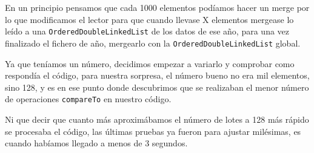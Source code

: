 \documentclass[a4paper,11pt]{report}
\begin{document}
En un principio pensamos que cada 1000 elementos podíamos hacer un merge por lo que modificamos el lector para que cuando llevase X elementos mergease lo leído a una \texttt{OrderedDoubleLinkedList} de los datos de ese año, para una vez finalizado el fichero de año, mergearlo con la \texttt{OrderedDoubleLinkedList} global.

Ya que teníamos un número, decidimos empezar a variarlo y comprobar como respondía el código, para nuestra sorpresa, el número bueno no era mil elementos, sino 128, y es en ese punto donde descubrimos que se realizaban el menor número de operaciones \texttt{compareTo} en nuestro código.

Ni que decir que cuanto más aproximábamos el número de lotes a 128 más rápido se procesaba el código, las últimas pruebas ya fueron para ajustar milésimas, es cuando habíamos llegado a menos de 3 segundos.
\end{document}
